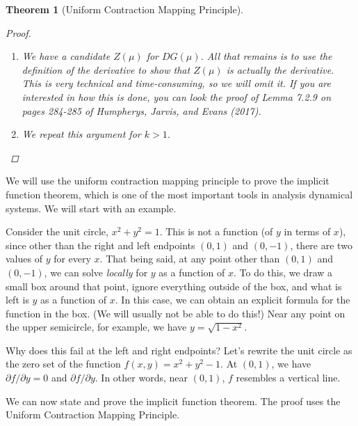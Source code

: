 \documentclass[10pt]{article}         %
\newtheorem{theorem}{Theorem}[section]
\theoremstyle{remark}
\begin{document}
\begin{theorem}[Uniform Contraction Mapping Principle]
\begin{proof}
\begin{enumerate}
\item We have a candidate $Z(\mu)$ for $DG(\mu)$. All that remains is to use the definition of the derivative to show that $Z(\mu)$ is actually the derivative. This is very technical and time-consuming, so we will omit it. If you are interested in how this is done, you can look the proof of Lemma 7.2.9 on pages 284-285 of Humpherys, Jarvis, and Evans (2017).

\item We repeat this argument for $k > 1$.
\end{enumerate}

\end{proof}
\end{theorem}

We will use the uniform contraction mapping principle to prove the implicit function theorem, which is one of the most important tools in analysis dynamical systems. We will start with an example.

Consider the unit circle, $x^2 + y^2 = 1$. This is not a function (of $y$ in terms of $x$), since other than the right and left endpoints $(0, 1)$ and $(0, -1)$, there are two values of $y$ for every $x$. That being said, at any point other than $(0, 1)$ and $(0, -1)$, we can solve \emph{locally} for $y$ as a function of $x$. To do this, we draw a small box around that point, ignore everything outside of the box, and what is left is $y$ as a function of $x$. In this case, we can obtain an explicit formula for the function in the box. (We will usually not be able to do this!) Near any point on the upper semicircle, for example, we have $y = \sqrt{1 - x^2}$.

Why does this fail at the left and right endpoints? Let's rewrite the unit circle as the zero set of the function $f(x, y) = x^2 + y^2 - 1$. At $(0, 1)$, we have $\partial f / \partial y = 0$ and $\partial f / \partial y$. In other words, near $(0, 1)$, $f$ resembles a vertical line.

We can now state and prove the implicit function theorem. The proof uses the Uniform Contraction Mapping Principle.
\end{document}
